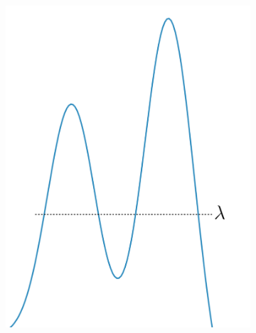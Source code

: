 \begin{figure}[h]
\centering 
\begin{subfigure}{.5\columnwidth}
    \includegraphics[width=\columnwidth]{main_figures/intro/density_cluster.png}
    \caption{}
    \label{fig:density}
\end{subfigure}%
\begin{subfigure}{.5\columnwidth}

\end{subfigure}
\end{figure}
